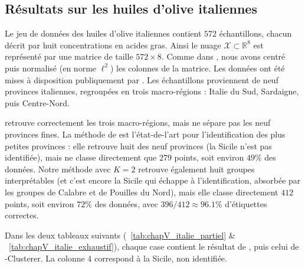 
\subsection{Résultats sur les huiles d'olive italiennes}
\label{subsec:chapV_huiles_olive}

Le jeu de données des huiles d'olive italiennes \cite{HuileOlive} contient $572$ échantillons, chacun décrit par huit concentrations en acides gras. 
Ainsi le nuage $\mathcal X \subset \mathbb R^8$ est représenté par une matrice de taille $572 \times 8$.
Comme dans \cite{DegreeRipsRolleScoccola}, nous avons centré puis normalisé (en norme $\ell^2$) les colonnes de la matrice.
Les données ont été mises à disposition publiquement par \cite{DonneesHuileOlive}. Les échantillons proviennent de neuf provinces italiennes, regroupées en trois macro-régions : Italie du Sud, Sardaigne, puis Centre-Nord. 


\HDBSCAN retrouve correctement les trois macro-régions, mais ne sépare pas les neuf provinces fines. La méthode  de \cite{DegreeRipsRolleScoccola} est l'état-de-l'art pour l'identification des plus petites provinces : elle retrouve huit des neuf provinces (la Sicile n'est pas identifiée), mais ne classe directement que $279$ points, soit environ $49\%$ des données. Notre méthode \cite{BibiAppliedNetworkScience} avec $K=2$ retrouve également huit groupes interprétables (et c'est encore la Sicile qui échappe à l'identification, absorbée par les groupes de Calabre et de Pouilles du Nord), mais elle classe directement $412$ points, soit environ $72\%$ des données, avec $396/412\approx96.1\%$ d'étiquettes correctes.

Dans les deux tableaux suivants (\Tab~\ref{tab:chapV_italie_partiel} \& \Tab~\ref{tab:chapV_italie_exhaustif}), chaque case contient le résultat de , puis celui de \HGP-Clusterer. La colonne $4$ correspond à la Sicile, non identifiée.

